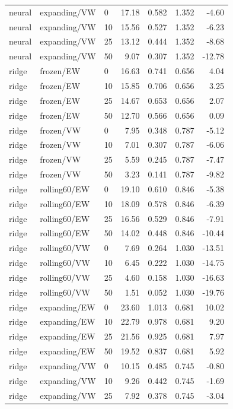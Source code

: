 {\begin{longtable}{@{}lllrrrr@{}}
neural & expanding/VW & 0 & 17.18 & 0.582 & 1.352 & -4.60\\
neural & expanding/VW & 10 & 15.56 & 0.527 & 1.352 & -6.23\\
neural & expanding/VW & 25 & 13.12 & 0.444 & 1.352 & -8.68\\
neural & expanding/VW & 50 & 9.07 & 0.307 & 1.352 & -12.78\\
ridge & frozen/EW & 0 & 16.63 & 0.741 & 0.656 & 4.04\\
ridge & frozen/EW & 10 & 15.85 & 0.706 & 0.656 & 3.25\\
ridge & frozen/EW & 25 & 14.67 & 0.653 & 0.656 & 2.07\\
ridge & frozen/EW & 50 & 12.70 & 0.566 & 0.656 & 0.09\\
ridge & frozen/VW & 0 & 7.95 & 0.348 & 0.787 & -5.12\\
ridge & frozen/VW & 10 & 7.01 & 0.307 & 0.787 & -6.06\\
ridge & frozen/VW & 25 & 5.59 & 0.245 & 0.787 & -7.47\\
ridge & frozen/VW & 50 & 3.23 & 0.141 & 0.787 & -9.82\\
ridge & rolling60/EW & 0 & 19.10 & 0.610 & 0.846 & -5.38\\
ridge & rolling60/EW & 10 & 18.09 & 0.578 & 0.846 & -6.39\\
ridge & rolling60/EW & 25 & 16.56 & 0.529 & 0.846 & -7.91\\
ridge & rolling60/EW & 50 & 14.02 & 0.448 & 0.846 & -10.44\\
ridge & rolling60/VW & 0 & 7.69 & 0.264 & 1.030 & -13.51\\
ridge & rolling60/VW & 10 & 6.45 & 0.222 & 1.030 & -14.75\\
ridge & rolling60/VW & 25 & 4.60 & 0.158 & 1.030 & -16.63\\
ridge & rolling60/VW & 50 & 1.51 & 0.052 & 1.030 & -19.76\\
ridge & expanding/EW & 0 & 23.60 & 1.013 & 0.681 & 10.02\\
ridge & expanding/EW & 10 & 22.79 & 0.978 & 0.681 & 9.20\\
ridge & expanding/EW & 25 & 21.56 & 0.925 & 0.681 & 7.97\\
ridge & expanding/EW & 50 & 19.52 & 0.837 & 0.681 & 5.92\\
ridge & expanding/VW & 0 & 10.15 & 0.485 & 0.745 & -0.80\\
ridge & expanding/VW & 10 & 9.26 & 0.442 & 0.745 & -1.69\\
ridge & expanding/VW & 25 & 7.92 & 0.378 & 0.745 & -3.04\\

\end{longtable}}
